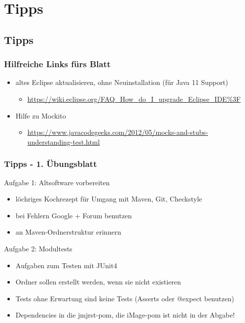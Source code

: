 \documentclass[18pt]{beamer}
\begin{document}
\section{Tipps}
	\subsection{Tipps}
	
	\begin{frame}
		\frametitle{Hilfreiche Links fürs Blatt}
		\begin{itemize}
			\item altes Eclipse aktualisieren, ohne Neuinstallation (für Java 11 Support)
			\begin{itemize}
				\item \url{https://wiki.eclipse.org/FAQ\_How\_do\_I\_upgrade\_Eclipse\_IDE\%3F}
			\end{itemize}
			\item Hilfe zu Mockito
			\begin{itemize}
				\item \url{https://www.javacodegeeks.com/2012/05/mocks-and-stubs-understanding-test.html}
			\end{itemize}
		\end{itemize}
\end{frame}
	
	
	\begin{frame}
		\frametitle{Tipps - 1. Übungsblatt}
		\begin{small}
			\begin{exampleblock}{Aufgabe 1: Altsoftware vorbereiten}
				\begin{itemize}
					\item löchriges Kochrezept für Umgang mit Maven, Git, Checkstyle
					\item bei Fehlern Google + Forum benutzen
					\item an Maven-Ordnerstruktur erinnern
				\end{itemize}
			\end{exampleblock}
			\pause
			\begin{exampleblock}{Aufgabe 2: Modultests}
				\begin{itemize}
					\item Aufgaben zum Testen mit JUnit4
					\item Ordner sollen erstellt werden, wenn sie nicht existieren
					\item Tests ohne Erwartung sind keine Tests (Asserts oder @expect benutzen)
					\item Dependencies in die jmjrst-pom, die iMage-pom ist nicht in der Abgabe!
				\end{itemize}
			\end{exampleblock}
		\end{small}
	\end{frame}
\end{document}
